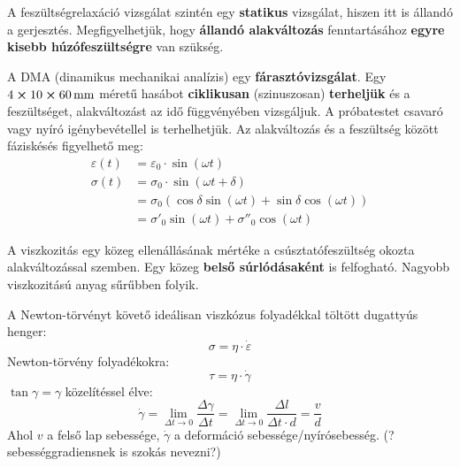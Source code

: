 \documentclass[12pt,a4paper]{article}       %
\begin{document}
\begin{tcbitemize}
  \tcbitem[title={\# \thetcbrasternum{} –
        Mi a feszültségrelaxáció?
      }]
  A feszültségrelaxáció vizsgálat szintén egy \textbf{statikus} vizsgálat,
  hiszen itt is állandó a gerjesztés. Megfigyelhetjük, hogy \textbf{állandó
    alakváltozás} fenntartásához \textbf{egyre kisebb húzófeszültségre} van
  szükség.




  \tcbitem[title={\# \thetcbrasternum{} –
        Mi a DM(T)A?
      }]
  A DMA (dinamikus mechanikai analízis) egy \textbf{fárasztóvizsgálat}. Egy $4
    \cross 10 \cross 60 \, \mathrm{mm}$ méretű hasábot \textbf{ciklikusan}
  (szinuszosan) \textbf{terheljük} és a feszültséget, alakváltozást az idő
  függvényében vizsgáljuk. A próbatestet csavaró vagy nyíró igénybevétellel is
  terhelhetjük. Az alakváltozás és a feszültség között fáziskésés figyelhető
  meg:
  \begin{align*}
    \varepsilon(t) & = \varepsilon_0 \cdot \sin(\omega t)
    \\
    \sigma(t)      & = \sigma_0 \cdot \sin(\omega t + \delta)
    \\
                   & = \sigma_0 \left(
    \cos \delta \sin(\omega t) +
    \sin \delta \cos(\omega t)
    \right)
    \\
                   & = \sigma'_0 \sin(\omega t) + \sigma''_0 \cos(\omega t)
  \end{align*}



  \tcbitem[title={\# \thetcbrasternum{} –
        Definiálja a viszkozitást!
      }]
  A viszkozitás egy közeg ellenállásának mértéke a csúsztatófeszültség okozta
  alakváltozással szemben. Egy közeg \textbf{belső súrlódásaként} is
  felfogható. Nagyobb viszkozitású anyag sűrűbben folyik.



  \tcbitem[title={\# \thetcbrasternum{} –
        Írja fel a Newton törvényt folyadékok esetére!
      }]
  A Newton-törvényt követő ideálisan viszkózus folyadékkal töltött dugattyús
  henger:
  \[
    \sigma = \eta \cdot \dot{\varepsilon}
  \]
  Newton-törvény folyadékokra:
  \[
    \tau = \eta \cdot \dot{\gamma}
  \]
  $\tan{\gamma} = \gamma$ közelítéssel élve:
  \[
    \dot{\gamma}
    = \lim_{\Delta t \rightarrow 0} \frac{\Delta \gamma}{\Delta t}
    = \lim_{\Delta t \rightarrow 0} \frac{\Delta l}{\Delta t \cdot d}
    = \frac{v}{d}
  \]
  Ahol $v$ a felső lap sebessége, $\dot{\gamma}$ a deformáció
  sebessége/nyírósebesség. (?sebességgradiensnek is szokás nevezni?)




\end{tcbitemize}
\end{document}
